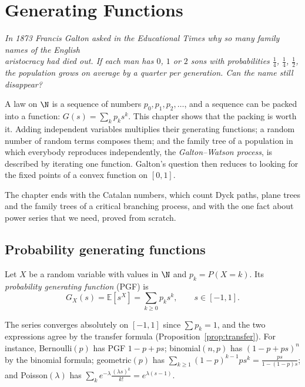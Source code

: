 \chapter{Generating Functions}

\begin{center}\itshape
In 1873 Francis Galton asked in the \emph{Educational Times} why so many family names of the English\\
aristocracy had died out. If each man has $0$, $1$ or $2$ sons with probabilities $\frac14$, $\frac14$, $\frac12$,\\
the population grows on average by a quarter per generation. Can the name still disappear?
\end{center}

A law on $\N$ is a sequence of numbers $p_0,p_1,p_2,\ldots$, and a sequence can be packed into a function:
$G(s)=\sum_kp_ks^k$. This chapter shows that the packing is worth it. Adding independent variables multiplies
their generating functions; a random number of random terms composes them; and the family tree of a population
in which everybody reproduces independently, the \emph{Galton--Watson process}, is described by iterating one
function. Galton's question then reduces to looking for the fixed points of a convex function on $[0,1]$.

The chapter ends with the Catalan numbers, which count Dyck paths, plane trees and the family trees of a
critical branching process, and with the one fact about power series that we need, proved from scratch.

\section{Probability generating functions}

\begin{definition}
Let $X$ be a random variable with values in $\N$ and $p_k=P(X=k)$. Its \emph{probability generating function}
(PGF) is
\[
G_X(s)=\mathbb E[s^X]=\sum_{k\ge0}p_ks^k,\qquad s\in[-1,1].
\]
\end{definition}

The series converges absolutely on $[-1,1]$ since $\sum p_k=1$, and the two expressions agree by the transfer
formula (Proposition~\ref{prop:transfer}). For instance, Bernoulli$(p)$ has PGF $1-p+ps$; binomial$(n,p)$ has
$(1-p+ps)^n$ by the binomial formula; geometric$(p)$ has $\sum_{k\ge1}(1-p)^{k-1}ps^k=\frac{ps}{1-(1-p)s}$; and
Poisson$(\lambda)$ has $\sum_ke^{-\lambda}\frac{(\lambda s)^k}{k!}=e^{\lambda(s-1)}$.

